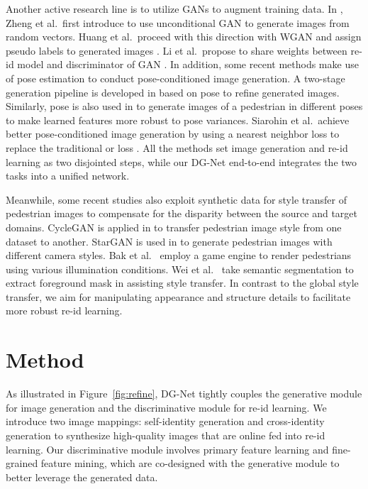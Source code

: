 \documentclass[10pt,twocolumn,letterpaper]{article}
\begin{document}
Another active research line is to utilize GANs to augment training data. In \cite{zheng2017unlabeled}, Zheng et al.\ first introduce to use unconditional GAN to generate images from random vectors. Huang et al.\  proceed with this direction with WGAN \cite{arjovsky2017wasserstein} and assign pseudo labels to generated images \cite{huang2018multi}. Li et al.\ propose to share weights between re-id model and discriminator of GAN \cite{li2018adversarial}. In addition, some recent methods make use of pose estimation to conduct pose-conditioned image generation. A two-stage generation pipeline is developed in \cite{ma2017pose} based on pose to refine generated images. Similarly, pose is also used in \cite{ge2018fdgan, liu2018pose,qian2017pose} to generate images of a pedestrian in different poses to make learned features more robust to pose variances. Siarohin et al.\ achieve better pose-conditioned image generation by using a nearest neighbor loss to replace the traditional  or  loss \cite{siarohin2018deformable}. All the methods set image generation and re-id learning as two disjointed steps, while our DG-Net end-to-end integrates the two tasks into a unified network.           

Meanwhile, some recent studies also exploit synthetic data for style transfer of pedestrian images to compensate for the disparity between the source and target domains. CycleGAN \cite{CycleGAN2017} is applied in \cite{deng2018image,zhong2019invariance} to transfer pedestrian image style from one dataset to another. StarGAN \cite{choi2018stargan} is used in \cite{zhong2018generalizing} to generate pedestrian images with different camera styles. Bak et al.\  \cite{bak2018domain} employ a game engine to render pedestrians using various illumination conditions. Wei et al.\ \cite{wei2018person} take semantic segmentation to extract foreground mask in assisting style transfer. In contrast to the global style transfer, we aim for manipulating appearance and structure details to facilitate more robust re-id learning. 

\section{Method}

As illustrated in Figure~\ref{fig:refine}, DG-Net tightly couples the generative module for image generation and the discriminative module for re-id learning. We introduce two image mappings: self-identity generation and cross-identity generation to synthesize high-quality images that are online fed into re-id learning. Our discriminative module involves primary feature learning and fine-grained feature mining, which are co-designed with the generative module to better leverage the generated data.   
\end{document}
